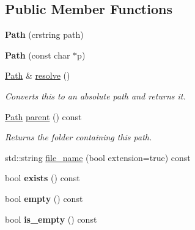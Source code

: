 \subsection*{Public Member Functions}
\begin{DoxyCompactItemize}
\item 
\mbox{\label{classnta_1_1utils_1_1Path_a1fe69ab28332246bb5c39fe31b322d0c}} 
{\bfseries Path} (crstring path)
\item 
\mbox{\label{classnta_1_1utils_1_1Path_a34f62db3f2752ebdb1b43021236e8ac2}} 
{\bfseries Path} (const char $\ast$p)
\item 
\mbox{\label{classnta_1_1utils_1_1Path_a05c3d1cf0849617292cedabb549c8669}} 
\hyperlink{classnta_1_1utils_1_1Path}{Path} \& \hyperlink{classnta_1_1utils_1_1Path_a05c3d1cf0849617292cedabb549c8669}{resolve} ()
\begin{DoxyCompactList}\small\item\em Converts this to an absolute path and returns it. \end{DoxyCompactList}\item 
\hyperlink{classnta_1_1utils_1_1Path}{Path} \hyperlink{classnta_1_1utils_1_1Path_aa124dc05466b3f681d02579fa0022a6a}{parent} () const
\begin{DoxyCompactList}\small\item\em Returns the folder containing this path. \end{DoxyCompactList}\item 
std\+::string \hyperlink{classnta_1_1utils_1_1Path_a7913426e42b3ac300554ae7adb740a0a}{file\+\_\+name} (bool extension=true) const
\item 
\mbox{\label{classnta_1_1utils_1_1Path_a211a5a235b5f7fba36caccf6e4688427}} 
bool {\bfseries exists} () const
\item 
\mbox{\label{classnta_1_1utils_1_1Path_a7455a919c629658fea5cb9bfe25197a3}} 
bool {\bfseries empty} () const
\item 
\mbox{\label{classnta_1_1utils_1_1Path_ae21913de2f7edabf943e12197ebd678f}} 
bool {\bfseries is\+\_\+empty} () const
\item 

\end{DoxyCompactItemize}
